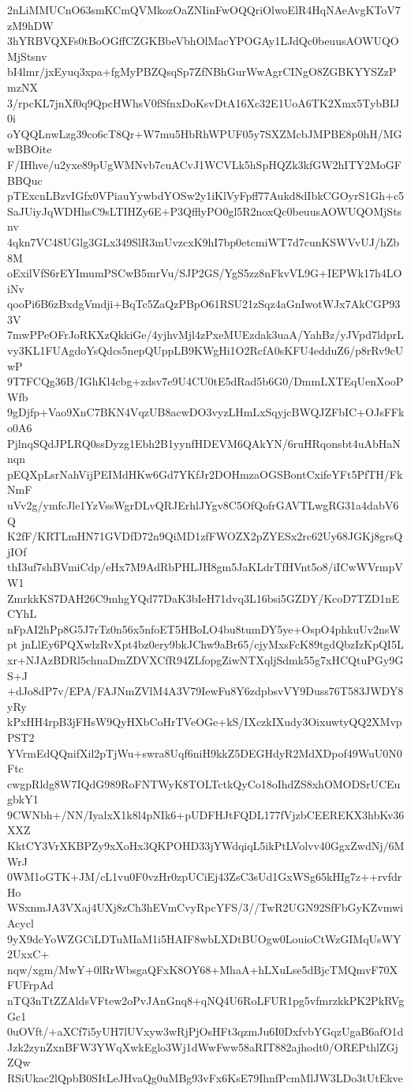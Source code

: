 2nLiMMUCnO63smKCmQVMkozOaZNIinFwOQQriOlwoElR4HqNAeAvgKToV7zM9hDW
3hYRBVQXFs0tBoOGffCZGKBbeVbhOlMacYPOGAy1LJdQc0beuusAOWUQOMjStsnv
bI4lmr/jxEyuq3xpa+fgMyPBZQsqSp7ZfNBhGurWwAgrCINgO8ZGBKYYSZzPmzNX
3/rpcKL7jnXf0q9QpcHWhsV0fSfnxDoKsvDtA16Xc32E1UoA6TK2Xmx5TybBIJ0i
oYQQLnwLzg39co6cT8Qr+W7mu5HbRhWPUF05y7SXZMcbJMPBE8p0hH/MGwBBOite
F/IHhve/u2yxe89pUgWMNvb7cuACvJ1WCVLk5hSpHQZk3kfGW2hITY2MoGFBBQuc
pTExcnLBzvIGfx0VPiauYywbdYOSw2y1iKlVyFpff77Aukd8dIbkCGOyrS1Gh+c5
SaJUiyJqWDHhsC9sLTIHZy6E+P3QfflyPO0gl5R2noxQc0beuusAOWUQOMjStsnv
4qkn7VC48UGlg3GLx349SlR3mUvzcxK9hI7bp0etcmiWT7d7cunKSWVvUJ/hZb8M
oExilVfS6rEYImumPSCwB5mrVu/SJP2GS/YgS5zz8nFkvVL9G+IEPWk17h4LOiNv
qooPi6B6zBxdgVmdji+BqTc5ZaQzPBpO61RSU21zSqz4aGnIwotWJx7AkCGP933V
7mwPPeOFrJoRKXzQkkiGe/4yjhvMjl4zPxeMUEzdak3uaA/YahBz/yJVpd7ldprL
vy3KL1FUAgdoYsQdcs5nepQUppLB9KWgHi1O2RcfA0sKFU4edduZ6/p8rRv9cUwP
9T7FCQg36B/IGhKl4cbg+zdsv7e9U4CU0tE5dRad5b6G0/DmmLXTEqUenXooPWfb
9gDjfp+Vao9XnC7BKN4VqzUB8acwDO3vyzLHmLxSqyjcBWQJZFbIC+OJsFFko0A6
PjlnqSQdJPLRQ0ssDyzg1Ebh2B1yynfHDEVM6QAkYN/6ruHRqonsbt4uAbHaNnqn
pEQXpLsrNahVijPEIMdHKw6Gd7YKfJr2DOHmzaOGSBontCxifeYFt5PfTH/FkNmF
uVv2g/ymfcJle1YzVssWgrDLvQRJErhlJYgv8C5OfQofrGAVTLwgRG31a4dabV6Q
K2fF/KRTLmHN71GVDfD72n9QiMD1zfFWOZX2pZYESx2rc62Uy68JGKj8grsQjIOf
thI3uf7shBVmiCdp/eHx7M9AdRbPHLJH8gm5JaKLdrTfHVnt5o8/iICwWVrmpVW1
ZmrkkKS7DAH26C9mhgYQd77DaK3bIeH71dvq3L16bsi5GZDY/KcoD7TZD1nECYhL
nFpAI2hPp8G5J7rTz0n56x5nfoET5HBoLO4bu8tumDY5ye+OspO4phkuUv2nsWpt
jnLlEy6PQXwlzRvXpt4bz0ery9bkJChw9aBr65/cjyMxsFcK89tgdQbzIzKpQI5L
xr+NJAzBDRl5chnaDmZDVXCfR94ZLfopgZiwNTXqljSdmk55g7xHCQtuPGy9GS+J
+dJo8dP7v/EPA/FAJNmZVlM4A3V79IewFu8Y6zdpbsvVY9Duss76T583JWDY8yRy
kPxHH4rpB3jFHsW9QyHXbCoHrTVeOGe+kS/IXczkIXudy3OixuwtyQQ2XMvpPST2
YVrmEdQQnifXil2pTjWu+swra8Uqf6niH9kkZ5DEGHdyR2MdXDpof49WuU0N0Ftc
cwgpRldg8W7IQdG989RoFNTWyK8TOLTctkQyCo18oIhdZS8xhOMODSrUCEugbkY1
9CWNbh+/NN/IyalxX1k8l4pNIk6+pUDFHJtFQDL177fVjzbCEEREKX3hbKv36XXZ
KktCY3VrXKBPZy9xXoHx3QKPOHD33jYWdqiqL5ikPtLVolvv40GgxZwdNj/6MWrJ
0WM1oGTK+JM/cL1vu0F0vzHr0zpUCiEj43ZsC3sUd1GxWSg65kHIg7z++rvfdrHo
WSxnmJA3VXaj4UXj8zCh3hEVmCvyRpcYFS/3//TwR2UGN92SfFbGyKZvmwiAcycl
9yX9dcYoWZGCiLDTuMIaM1i5HAIF8wbLXDtBUOgw0LouioCtWzGIMqUsWY2UxxC+
nqw/xgm/MwY+0lRrWbsgaQFxK8OY68+MhaA+hLXuLse5dBjcTMQmvF70XFUFrpAd
nTQ3nTtZZAldsVFtew2oPvJAnGnq8+qNQ4U6RoLFUR1pg5vfmrzkkPK2PkRVgGc1
0uOVft/+aXCf7i5yUH7lUVxyw3wRjPjOsHFt3qzmJu6I0DxfvbYGqzUgaB6afO1d
Jzk2zynZxnBFW3YWqXwkEglo3Wj1dWwFww58aRIT882ajhodt0/OREPthlZGjZQw
RSiUkac2lQpbB0SItLeJHvaQg0uMBg93vFx6KsE79IhnfPcmMlJW3LDo3tUtEkve
